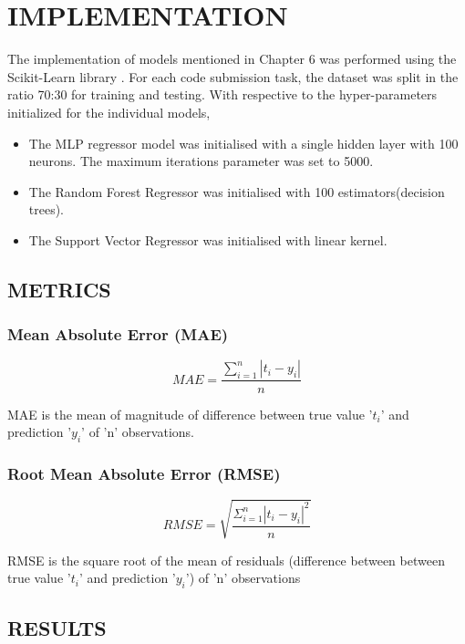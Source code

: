 \chapter{IMPLEMENTATION}

The implementation of models mentioned in Chapter 6 was performed using the Scikit-Learn library \cite{E}. For each code submission task, the dataset was split in the ratio 70:30 for training and testing. With respective to the hyper-parameters initialized for the individual models, 

\begin{itemize}
    \item The MLP regressor model was initialised with a single hidden layer with 100 neurons. The maximum iterations parameter was set to 5000. 
    \item The Random Forest Regressor was initialised with 100 estimators(decision trees).
    \item The Support Vector Regressor was initialised with linear kernel.
\end{itemize} 


\section{METRICS}
 

\subsection{Mean Absolute Error (MAE)}

\[ MAE = \frac{\sum_{i=1}^{n}|t_i-y_i|}{n} \]

MAE is the mean of magnitude of difference between true value '$t_{i}$' and prediction '$y_{i}$' of 'n' observations.

\subsection{Root Mean Absolute Error (RMSE)}

\[ RMSE = \sqrt{\frac{\Sigma_{i=1}^{n}{|t_i-y_i|}^2}{n}} \]

RMSE is the square root of the mean of residuals (difference between between true value '$t_{i}$' and prediction '$y_{i}$') of 'n' observations 

\section{RESULTS}

